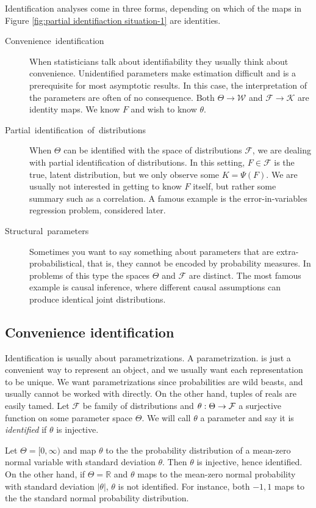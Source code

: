 Identification analyses come in three forms, depending on which of the maps in Figure \ref{fig:partial identifiaction situation-1} are identities. 
\begin{description}
\item [{Convenience~identification}] When statisticians talk about identifiability they usually think about convenience. Unidentified parameters make estimation difficult and is a prerequisite for most asymptotic results. In this case, the interpretation of the parameters are often of no consequence. Both $\Theta\to\mathcal{W}$ and $\mathcal{F}\to\mathcal{K}$ are identity maps. We know $F$ and wish to know $\theta$. 
\item [{Partial~identification~of~distributions}] When $\Theta$ can be identified with the space of distributions $\mathcal{F}$, we are dealing with partial identification of distributions. In this setting, $F\in\mathcal{F}$ is the true, latent distribution, but we only observe some $K=\Psi(F)$. We are usually not interested in getting to know $F$ itself, but rather some summary such as a correlation. A famous example is the error-in-variables regression problem, considered later.
\item [{Structural~parameters}] Sometimes you want to say something about parameters that are extra-probabilistical, that is, they cannot be encoded by probability measures. In problems of this type the spaces $\Theta$ and $\mathcal{F}$ are distinct. The most famous example is causal inference, where different causal assumptions can produce identical joint distributions. 
\end{description}

\subsection{Convenience identification}

Identification is usually about parametrizations. A parametrization. is just a convenient way to represent an object, and we usually want each representation to be unique. We want parametrizations since probabilities are wild beasts, and usually cannot be worked with directly. On the other hand, tuples of reals are easily tamed. Let $\mathcal{F}$ be family of distributions and $\theta:\text{\ensuremath{\Theta\to\mathcal{F}}}$ a surjective function on some parameter space $\Theta$. We will call $\theta$ a parameter and say it is\emph{ identified }if $\theta$ is injective. 
\begin{example}
\label{exa:normal unidentified}Let $\Theta=[0,\infty)$ and map $\theta$ to the the probability distribution of a mean-zero normal variable with standard deviation $\theta$. Then $\theta$ is injective, hence identified. On the other hand, if $\Theta=\mathbb{R}$ and $\theta$ maps to the mean-zero normal probability with standard deviation $|\theta|$, $\theta$ is not identified. For instance, both $-1,1$ maps to the the standard normal probability distribution.
\end{example}

